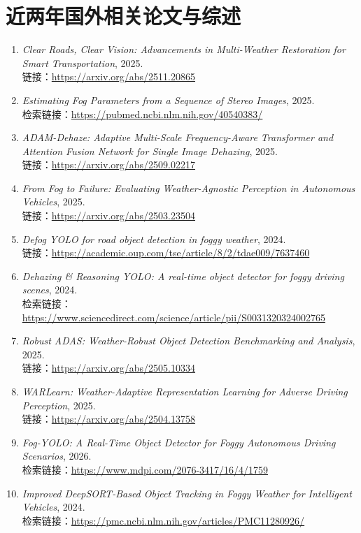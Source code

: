 \section{近两年国外相关论文与综述}

\begin{enumerate}[leftmargin=2.5em]
\item \emph{Clear Roads, Clear Vision: Advancements in Multi-Weather Restoration for Smart Transportation}, 2025. \\
  链接：\url{https://arxiv.org/abs/2511.20865}
\item \emph{Estimating Fog Parameters from a Sequence of Stereo Images}, 2025. \\
  检索链接：\url{https://pubmed.ncbi.nlm.nih.gov/40540383/}
\item \emph{ADAM-Dehaze: Adaptive Multi-Scale Frequency-Aware Transformer and Attention Fusion Network for Single Image Dehazing}, 2025. \\
  链接：\url{https://arxiv.org/abs/2509.02217}
\item \emph{From Fog to Failure: Evaluating Weather-Agnostic Perception in Autonomous Vehicles}, 2025. \\
  链接：\url{https://arxiv.org/abs/2503.23504}
\item \emph{Defog YOLO for road object detection in foggy weather}, 2024. \\
  链接：\url{https://academic.oup.com/tse/article/8/2/tdae009/7637460}
\item \emph{Dehazing \& Reasoning YOLO: A real-time object detector for foggy driving scenes}, 2024. \\
  检索链接：\url{https://www.sciencedirect.com/science/article/pii/S0031320324002765}
\item \emph{Robust ADAS: Weather-Robust Object Detection Benchmarking and Analysis}, 2025. \\
  链接：\url{https://arxiv.org/abs/2505.10334}
\item \emph{WARLearn: Weather-Adaptive Representation Learning for Adverse Driving Perception}, 2025. \\
  链接：\url{https://arxiv.org/abs/2504.13758}
\item \emph{Fog-YOLO: A Real-Time Object Detector for Foggy Autonomous Driving Scenarios}, 2026. \\
  检索链接：\url{https://www.mdpi.com/2076-3417/16/4/1759}
\item \emph{Improved DeepSORT-Based Object Tracking in Foggy Weather for Intelligent Vehicles}, 2024. \\
  检索链接：\url{https://pmc.ncbi.nlm.nih.gov/articles/PMC11280926/}
\end{enumerate}

